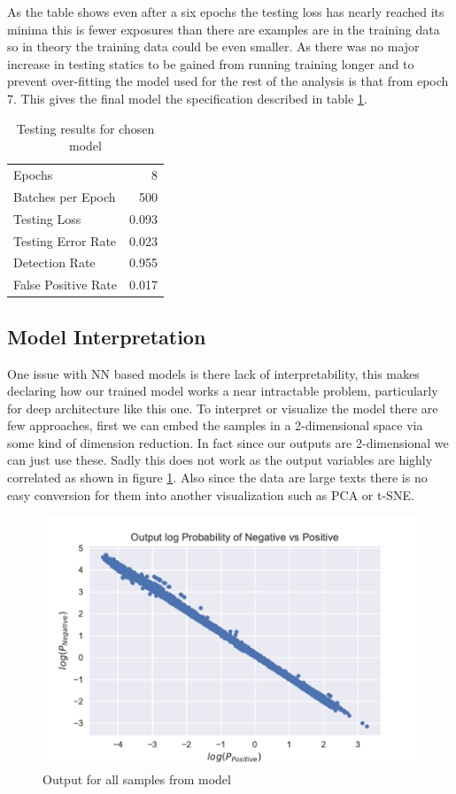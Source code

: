 \documentclass[12pt, a4paper]{article}
\begin{document}
As the table shows even after a six epochs the testing loss has nearly reached its minima this is fewer exposures than there are examples are in the training data so in theory the training data could be even smaller. As there was no major increase in testing statics to be gained from running training longer and to prevent over-fitting the model used for the rest of the analysis is that from epoch 7. This gives the final model the specification described in table \ref{t1}.

\begin{table}[H]
	\centering
	\begin{tabular}{l r}
		\toprule
		Epochs & 8  \\
		Batches per Epoch & 500\\
		Testing Loss &   0.093 \\
		Testing Error Rate & 0.023 \\
		Detection Rate & 0.955\\
		False Positive Rate& 0.017\\
		\bottomrule
	\end{tabular}
	\caption{Testing results for chosen model}\label{t1}
\end{table}

\subsection{Model Interpretation}

One issue with NN based models is there lack of interpretability, this makes declaring how our trained model works a near intractable problem, particularly for deep architecture like this one. To interpret or visualize the model there are few approaches, first we can embed the samples in a 2-dimensional space via some kind of dimension reduction. In fact since our outputs are 2-dimensional we can just use these. Sadly this does not work as the output variables are highly correlated as shown in figure \ref{pvn}. Also since the data are large texts there is no easy conversion for them into another visualization such as PCA or t-SNE.

\begin{figure}[H]
	\centering
	\includegraphics[width=\textwidth]{weight}
	\caption{Output for all samples from model}\label{pvn}
\end{figure}
\end{document}
